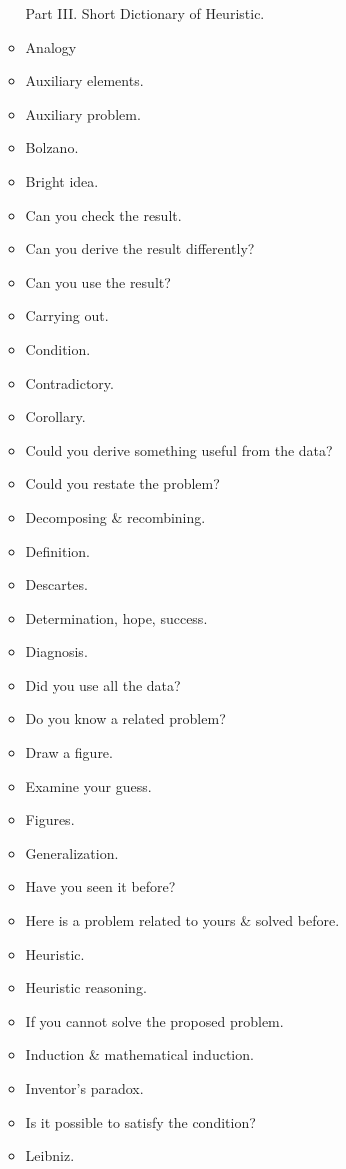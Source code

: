 \documentclass{article}
\begin{document}
\begin{enumerate}
\begin{itemize}
		Part III. Short Dictionary of Heuristic.
		\item {\sf Analogy}
		\item {\sf Auxiliary elements.}
		\item {\sf Auxiliary problem.}
		\item {\sf Bolzano.}
		\item {\sf Bright idea.}
		\item {\sf Can you check the result.}
		\item {\sf Can you derive the result differently?}
		\item {\sf Can you use the result?}
		\item {\sf Carrying out.}
		\item {\sf Condition.}
		\item {\sf Contradictory.}
		\item {\sf Corollary.}
		\item {\sf Could you derive something useful from the data?}
		\item {\sf Could you restate the problem?}
		\item {\sf Decomposing \& recombining.}
		\item {\sf Definition.}
		\item {\sf Descartes.}
		\item {\sf Determination, hope, success.}
		\item {\sf Diagnosis.}
		\item {\sf Did you use all the data?}
		\item {\sf Do you know a related problem?}
		\item {\sf Draw a figure.}
		\item {\sf Examine your guess.}
		\item {\sf Figures.}
		\item {\sf Generalization.}
		\item {\sf Have you seen it before?}
		\item {\sf Here is a problem related to yours \& solved before.}
		\item {\sf Heuristic.}
		\item {\sf Heuristic reasoning.}
		\item {\sf If you cannot solve the proposed problem.}
		\item {\sf Induction \& mathematical induction.}
		\item {\sf Inventor's paradox.}
		\item {\sf Is it possible to satisfy the condition?}
		\item {\sf Leibniz.}

\end{itemize}
\end{enumerate}
\end{document}
